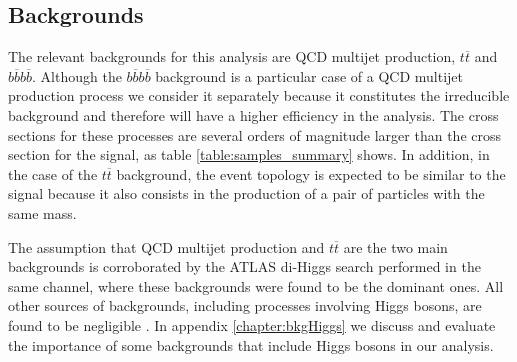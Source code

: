 

\subsection{Backgrounds}

The relevant backgrounds for this analysis are QCD multijet production, $t\overline{t}$ and $b\overline{b}b\overline{b}$. Although the $b\overline{b}b\overline{b}$ background is a particular case of a QCD multijet production process we consider it separately because it constitutes the irreducible background and therefore will have a higher efficiency in the analysis. The cross sections for these processes are several orders of magnitude larger than the cross section for the signal, as table \ref{table:samples_summary} shows. In addition, in the case of the $t\overline{t}$ background, the event topology is expected to be similar to the signal because it also consists in the production of a pair of particles with the same mass.

The assumption that QCD multijet production and $t\overline{t}$ are the two main backgrounds is corroborated by the ATLAS di-Higgs search performed in the same channel, where these backgrounds were found to be the dominant ones. All other sources of backgrounds, including processes involving Higgs bosons, are found to be negligible \cite{hh2bbbbATLAS}. In appendix \ref{chapter:bkgHiggs} we discuss and evaluate the importance of some backgrounds that include Higgs bosons in our analysis.

